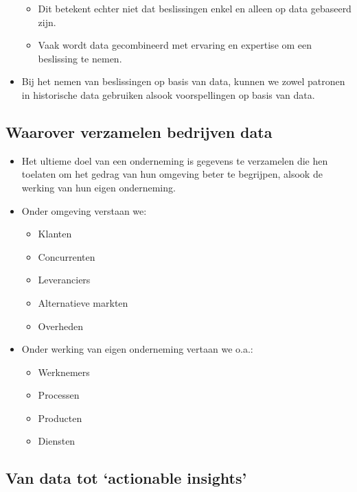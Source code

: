 \documentclass[]{tufte-book}
\providecommand{\tightlist}{%
  \setlength{\itemsep}{0pt}\setlength{\parskip}{0pt}}
\begin{document}
\begin{itemize}
  \begin{itemize}
  \tightlist
  \item
    Dit betekent echter niet dat beslissingen enkel en alleen op data gebaseerd zijn.
  \item
    Vaak wordt data gecombineerd met ervaring en expertise om een beslissing te nemen.
  \end{itemize}
\item
  Bij het nemen van beslissingen op basis van data, kunnen we zowel patronen in historische data gebruiken alsook voorspellingen op basis van data.
\end{itemize}

\hypertarget{waarover-verzamelen-bedrijven-data}{%
\subsection{Waarover verzamelen bedrijven data}\label{waarover-verzamelen-bedrijven-data}}

\begin{itemize}
\tightlist
\item
  Het ultieme doel van een onderneming is gegevens te verzamelen die hen toelaten om het gedrag van hun omgeving beter te begrijpen, alsook de werking van hun eigen onderneming.
\item
  Onder omgeving verstaan we:

  \begin{itemize}
  \tightlist
  \item
    Klanten
  \item
    Concurrenten
  \item
    Leveranciers
  \item
    Alternatieve markten
  \item
    Overheden
  \end{itemize}
\item
  Onder werking van eigen onderneming vertaan we o.a.:

  \begin{itemize}
  \tightlist
  \item
    Werknemers
  \item
    Processen
  \item
    Producten
  \item
    Diensten
  \end{itemize}
\end{itemize}

\hypertarget{van-data-tot-actionable-insights}{%
\subsection{Van data tot `actionable insights'}\label{van-data-tot-actionable-insights}}
\end{document}
